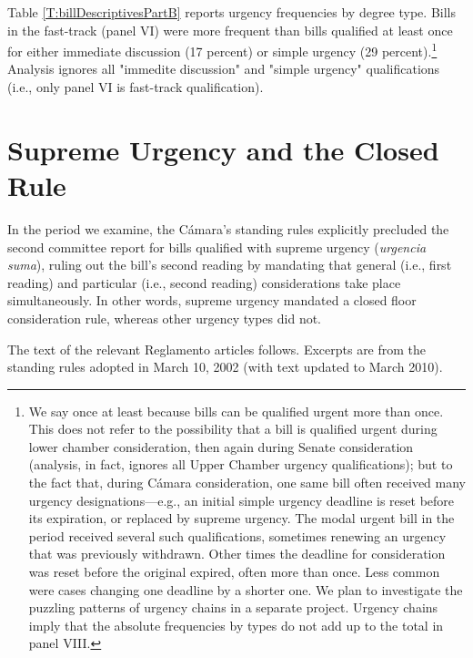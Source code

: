 \documentclass[letter,12pt]{article}
\begin{document}
Table \ref{T:billDescriptivesPartB} reports urgency frequencies by degree type. Bills in the fast-track (panel VI) were more frequent than bills qualified at least once for either immediate discussion (17 percent) or simple urgency (29 percent).\footnote{\label{fnNonExclusive}We say once at least because bills can be qualified urgent more than once. This does not refer to the possibility that a bill is qualified urgent during lower chamber consideration, then again during Senate consideration (analysis, in fact, ignores all Upper Chamber urgency qualifications); but to the fact that, during Cámara consideration, one same bill often received many urgency designations---e.g., an initial simple urgency deadline is reset before its expiration, or replaced by supreme urgency. The modal urgent bill in the period received several such qualifications, sometimes renewing an urgency that was previously withdrawn. Other times the deadline for consideration was reset before the original expired, often more than once. Less common were cases changing one deadline by a shorter one. We plan to investigate the puzzling patterns of urgency chains in a separate project. Urgency chains imply that the absolute frequencies by types do not add up to the total in panel VIII.} Analysis ignores all "immedite discussion" and "simple urgency" qualifications (i.e., only panel VI is fast-track qualification). 

\section{Supreme Urgency and the Closed Rule}

In the period we examine, the Cámara's standing rules explicitly precluded the second committee report for bills qualified with supreme urgency (\emph{urgencia suma}), ruling out the bill's second reading by mandating that general (i.e., first reading) and particular (i.e., second reading) considerations take place simultaneously. In other words, supreme urgency mandated a closed floor consideration rule, whereas other urgency types did not.

The text of the relevant Reglamento articles follows. Excerpts are from the standing rules adopted in March 10, 2002 (with text updated to March 2010).  
\end{document}
